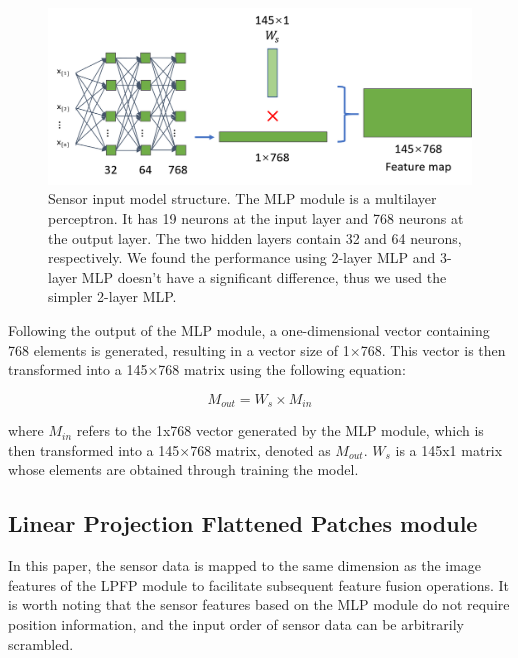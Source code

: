 \documentclass[acmsmall, screen]{acmart}
\begin{document}
\begin{figure}[htbp]
  \centering
  \includegraphics[width=0.7\linewidth]{pic/mlp_module.png}
  \caption{Sensor input model structure. The MLP module is a multilayer perceptron. It has 19 neurons at the input layer and 768 neurons at the output layer. The two hidden layers contain 32 and 64 neurons, respectively. We found the performance using 2-layer MLP and 3-layer MLP doesn’t have a significant difference, thus we used the simpler 2-layer MLP.}
  \label{mlp_module}
\end{figure}
Following the output of the MLP module, a one-dimensional vector containing 768 elements is generated, resulting in a vector size of 1\begin{math}
  \times
\end{math}768. This vector is then transformed into a 145\begin{math}
  \times
\end{math}768 matrix using the following equation:


\begin{equation}
  M_{out}=W_s\times M_{in}
\end{equation}

where  \begin{math}   M_{in} \end{math}  refers to the 1x768 vector generated by the MLP module, which is then transformed into a 145\begin{math}
  \times
\end{math}768 matrix, denoted as \begin{math}
  M_{out}
\end{math}. \begin{math}
  W_s
\end{math} is a 145x1 matrix whose elements are obtained through training the model.

\subsection{Linear Projection Flattened Patches module}
In this paper, the sensor data is mapped to the same dimension as the image features of the LPFP module to facilitate subsequent feature fusion operations. It is worth noting that the sensor features based on the MLP module do not require position information, and the input order of sensor data can be arbitrarily scrambled.
\end{document}
